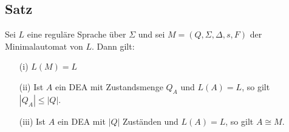 \documentclass[a4paper,11pt]{article}
\begin{document}
\subsection{Satz} Sei $L$ eine reguläre Sprache über $\Sigma$ und sei $M = (Q, \Sigma, \Delta, s, F)$ der Minimalautomat von $L$. Dann gilt:
\begin{itemize}
  \item [(i)] $L(M) = L$
  \item [(ii)] Ist $A$ ein DEA mit Zustandsmenge $Q_A$ und $L(A) = L$, so gilt $|Q_A| \leq |Q|$.
  \item [(iii)] Ist $A$ ein DEA mit $|Q|$ Zuständen und $L(A) = L$, so gilt $A \cong M$. 
\end{itemize}
\end{document}
